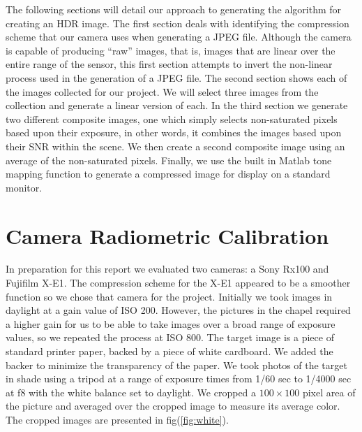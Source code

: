 \documentclass[a4paper]{article}
\begin{document}
The following sections will detail our approach to generating the algorithm for creating an HDR image.  The first section deals with identifying the compression scheme that our camera uses when generating a JPEG file.  Although the camera is capable of producing ``raw'' images, that is, images that are linear over the entire range of the sensor, this first section attempts to invert the non-linear process used in the generation of  a JPEG file.  The second section shows each of the images collected for our project.  We will select three images from the collection and generate a linear version of each. In the third section we generate two different composite images, one which simply selects non-saturated pixels based upon their exposure, in other words, it combines the images based upon their SNR within the  scene.  We then create a second composite image using an average of the non-saturated pixels.  Finally, we use the built in Matlab tone mapping function to generate a compressed image for display on a standard monitor. 
\section{Camera Radiometric Calibration}
In preparation for this report we evaluated two cameras: a Sony Rx100 and  Fujifilm X-E1.  The compression scheme for the X-E1 appeared to be a smoother function so we chose that camera for the project.  Initially we took images in daylight at a gain value of ISO 200.  However, the pictures in the chapel required a higher gain for us to be able to take images over a broad range of exposure values, so we repeated the process at ISO 800.  The target image is a piece of standard printer paper, backed by a piece of white cardboard. We added the backer to minimize the transparency of the paper.  We took photos of the target in shade using a tripod at a range of exposure times from 1/60 sec to 1/4000 sec at f8 with the white balance set to daylight. We cropped a $100 \times 100$ pixel area of the picture and averaged over the cropped image to measure its average color.  The cropped images are presented in fig(\ref{fig:white}). 
\end{document}
